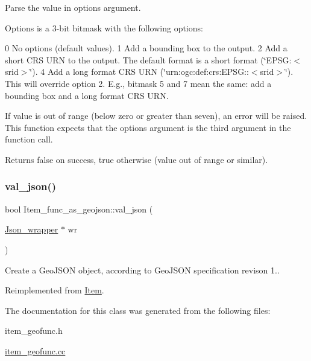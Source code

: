 Parse the value in options argument.

Options is a 3-\/bit bitmask with the following options\+:

0 No options (default values). 1 Add a bounding box to the output. 2 Add a short C\+RS U\+RN to the output. The default format is a short format (\char`\"{}\+E\+P\+S\+G\+:$<$srid$>$\char`\"{}). 4 Add a long format C\+RS U\+RN (\char`\"{}urn\+:ogc\+:def\+:crs\+:\+E\+P\+S\+G\+::$<$srid$>$\char`\"{}). This will override option 2. E.\+g., bitmask 5 and 7 mean the same\+: add a bounding box and a long format C\+RS U\+RN.

If value is out of range (below zero or greater than seven), an error will be raised. This function expects that the options argument is the third argument in the function call.

\begin{DoxyReturn}{Returns}
false on success, true otherwise (value out of range or similar). 
\end{DoxyReturn}
\mbox{\label{classItem__func__as__geojson_a5d5fa5457258b65c6123d14145c45bdd}} 
\subsubsection{\texorpdfstring{val\+\_\+json()}{val\_json()}}
{\footnotesize\ttfamily bool Item\+\_\+func\+\_\+as\+\_\+geojson\+::val\+\_\+json (\begin{DoxyParamCaption}\item[{\mbox{\hyperlink{classJson__wrapper}{Json\+\_\+wrapper}} $\ast$}]{wr }\end{DoxyParamCaption})\hspace{0.3cm}{\ttfamily [virtual]}}

Create a Geo\+J\+S\+ON object, according to Geo\+J\+S\+ON specification revison 1.. 

Reimplemented from \mbox{\hyperlink{classItem_a57e763fcde2d0a819d21e31c59611290}{Item}}.



The documentation for this class was generated from the following files\+:\begin{DoxyCompactItemize}
\item 
item\+\_\+geofunc.\+h\item 
\mbox{\hyperlink{item__geofunc_8cc}{item\+\_\+geofunc.\+cc}}\end{DoxyCompactItemize}
